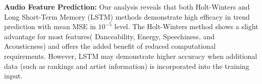 \documentclass{article}
\begin{document}
\textbf{Audio Feature Prediction:} Our analysis reveals that both Holt-Winters and Long Short-Term Memory (LSTM) methods demonstrate high efficacy in trend prediction with mean MSE in $10^{-5}$ level. The Holt-Winters method shows a slight advantage for most features( Danceability, Energy, Speechiness, and Acousticness) and offers the added benefit of reduced computational requirements.  However, LSTM may demonstrate higher accuracy when additional data (such as rankings and artist information) is incorporated into the training input.


\newpage




\end{document}
